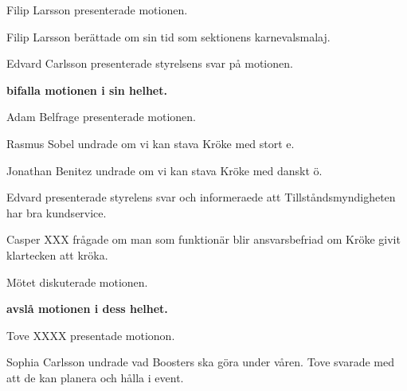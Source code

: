\documentclass[10pt]{article}
\begin{document}
\begin{paragrafer}
\begin{comment}
Henrik - vill göra en live undersökning under mötet så att man får underhåll.
Majoritet - OK om det är dyrare
Lika dana band för killar och tjejer. Mixad åsikt. 
Glattare band för att ha en tyngd på. Få svar, mixat. 
Sektionsrepresenativt på. 
--- HACKE 
--- Krusidull E -> Majoritet. 

Bredare för tjejer än för killar - OK Majoritet

Olika alternativ för tjejer, roset och band -> Majoritet. 
Subventionera tjejers band - mixat men majoriet för att subvetionera. 
Samma utseende -> Majoirtet 
\end{comment}

    \begin{paragrafer}

        Filip Larsson presenterade motionen. 

        Filip Larsson berättade om sin tid som sektionens karnevalsmalaj.  


        Edvard Carlsson presenterade styrelsens svar på motionen. 

        \textbf{\Mba bifalla motionen i sin helhet.}



      Adam Belfrage presenterade motionen. 

      Rasmus Sobel undrade om vi kan stava Kröke med stort e.

      Jonathan Benitez undrade om vi kan stava Kröke med danskt ö.

      Edvard presenterade styrelens svar och informeraede att Tillståndsmyndigheten har bra kundservice.

      Casper XXX frågade om man som funktionär blir ansvarsbefriad om Kröke givit klartecken att kröka. 

      Mötet diskuterade motionen.  

      \textbf{\Mba avslå motionen i dess helhet. }


      Tove XXXX presentade motionon. 

      Sophia Carlsson undrade vad Boosters ska göra under våren. Tove svarade med att de kan planera och hålla i event. 


\end{paragrafer}
\end{paragrafer}
\end{document}
